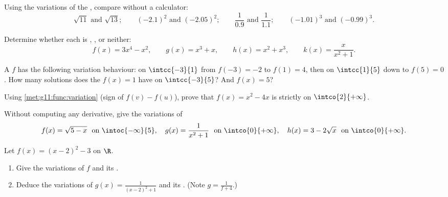 \begin{exercise}[$\star$]\label{exo:g11:func:2}
Using the variations of the , compare without a
calculator:
\[
\sqrt{11} \text{ and } \sqrt{13}; \qquad
(-2.1)^2 \text{ and } (-2.05)^2; \qquad
\frac{1}{0.9} \text{ and } \frac{1}{1.1}; \qquad
(-1.01)^3 \text{ and } (-0.99)^3 .
\]
\end{exercise}

\begin{exercise}[$\star$]\label{exo:g11:func:3}
Determine whether each  is , , or neither:
\[
f(x) = 3x^4 - x^2, \qquad
g(x) = x^3 + x, \qquad
h(x) = x^2 + x^3, \qquad
k(x) = \frac{x}{x^2+1} .
\]
\end{exercise}

\begin{exercise}[$\star$]\label{exo:g11:func:4}
A  $f$ has the following variation behaviour:  on
$\intcc{-3}{1}$ from $f(-3) = -2$ to $f(1) = 4$, then  on
$\intcc{1}{5}$ down to $f(5) = 0$. How many solutions does the 
$f(x) = 1$ have on $\intcc{-3}{5}$? And $f(x) = 5$?
\end{exercise}

\begin{exercise}[$\star\star$]\label{exo:g11:func:5}
Using \cref{met:g11:func:variation} (sign of $f(v) - f(u)$), prove that
$f(x) = x^2 - 4x$ is strictly  on $\intco{2}{+\infty}$.
\end{exercise}

\begin{exercise}[$\star\star$]\label{exo:g11:func:6}
Without computing any derivative, give the variations of
\[
f(x) = \sqrt{5 - x} \ \text{ on } \intoc{-\infty}{5},
\quad
g(x) = \frac{1}{x^2 + 1} \ \text{ on } \intco{0}{+\infty},
\quad
h(x) = 3 - 2\sqrt{x} \ \text{ on } \intco{0}{+\infty}.
\]
\end{exercise}

\begin{exercise}[$\star\star$]\label{exo:g11:func:7}
Let $f(x) = (x-2)^2 - 3$ on $\R$.
\begin{enumerate}
  \item Give the variations of $f$ and its .
  \item Deduce the variations of $g(x) = \frac{1}{(x-2)^2+1}$ and its
        . (Note $g = \frac{1}{f + 4}$.)
\end{enumerate}
\end{exercise}

